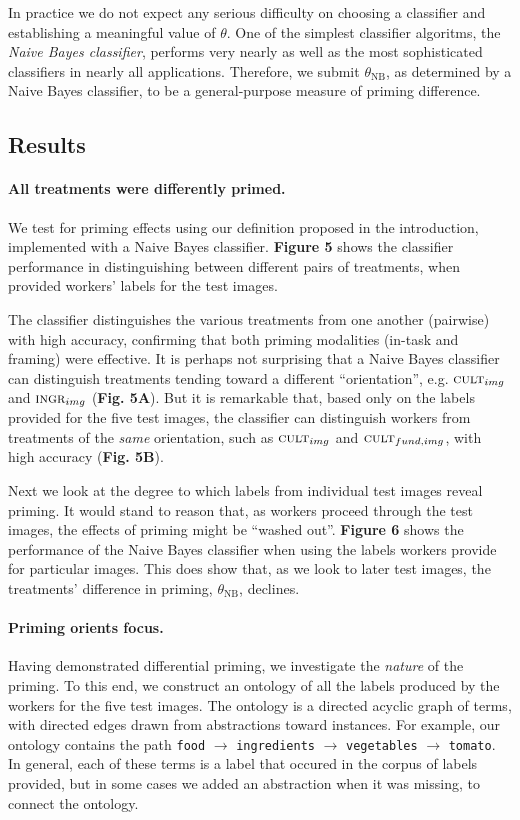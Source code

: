 \documentclass[a4paper]{report}
\begin{document}
In practice we do not expect any serious difficulty on choosing a classifier
and establishing a meaningful value of $\theta$.  One of the simplest 
classifier algoritms, the \textit{Naive Bayes classifier}, performs very 
nearly as well as the most sophisticated classifiers in nearly all 
applications.  Therefore, we submit $\theta_\text{NB}$, as determined by a 
Naive Bayes classifier, to be a general-purpose measure of priming difference.

\subsection*{Results}
\paragraph{All treatments were differently primed.}
We test for priming effects using our definition proposed in the introduction,
implemented with a Naive Bayes classifier.  \textbf{Figure 5} shows
the classifier performance in distinguishing between different pairs of 
treatments, when provided workers' labels for the test images.

The classifier distinguishes the various treatments from one another (pairwise)
with high accuracy, confirming that both priming modalities 
(in-task and framing) were effective.  It is perhaps not surprising that
a Naive Bayes classifier can distinguish treatments tending toward a different 
``orientation'', e.g. $\textsc{cult}_{img}$ and $\textsc{ingr}_{img}$
(\textbf{Fig. 5A}).
But it is remarkable that, based only on the labels provided for the five test 
images, the classifier can distinguish workers from treatments of the 
\textit{same} orientation, such as $\textsc{cult}_{img}$ and 
$\textsc{cult}_{fund, img}$, with high accuracy (\textbf{Fig. 5B}).

Next we look at the degree to which labels from individual test images reveal 
priming.  It would stand to reason that, as workers proceed through 
the test images, the effects of priming might be ``washed out''.  
\textbf{Figure 6} shows the
performance of the Naive Bayes classifier when using the labels workers provide
for particular images.  This does show that, as we look to later test images, 
the treatments' difference in priming, $\theta_\text{NB}$, declines.  

\paragraph{Priming orients focus.} Having demonstrated differential 
priming, we investigate the \textit{nature} of the priming.  To this
end, we construct an ontology of all the labels produced by the workers
for the five test images.  The ontology is a directed acyclic graph of terms,
with directed edges drawn from abstractions toward instances.  For example,
our ontology contains the path \texttt{food} $\to$ \texttt{ingredients} $\to$ 
\texttt{vegetables} 
$\to$ \texttt{tomato}.  In general, each of these terms is a label that
occured in the corpus of labels provided, but in some cases we added 
an abstraction when it was missing, to connect the ontology.
\end{document}
